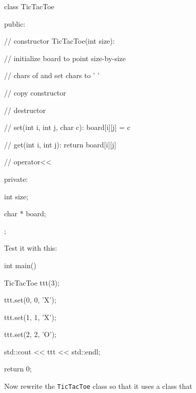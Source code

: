 
\begin{console}

class TicTacToe

{

public:

        // constructor TicTacToe(int size):

        // initialize board to point size-by-size

        // chars of and set chars to ' '



        // copy constructor



        // destructor



        // set(int i, int j, char c): board[i][j] = c



        // get(int i, int j): return board[i][j]



        // operator<<



private:

        int size;

        char * board;

};

\end{console}



Test it with this:



\begin{console}

int main()

{   

    TicTacToe ttt(3);

    ttt.set(0, 0, 'X');

    ttt.set(1, 1, 'X');

    ttt.set(2, 2, 'O');



    std::cout << ttt << std::endl;



    return 0;

}

\end{console}



Now rewrite the \texttt{TicTacToe} class so that it uses a class that

